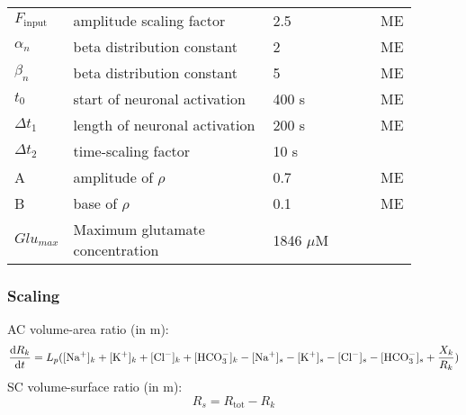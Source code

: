 \begin{table}[h!]
\centering
\begin{tabular}{ p{0.09\linewidth}  >{\footnotesize} p{0.5\linewidth}  >{\footnotesize} p{0.27\linewidth} >{\footnotesize} p{0.03\linewidth} }
\hline
$F_{\text{input}}$ 		& amplitude scaling factor 		& 2.5 		& ME \\ %
$\alpha_n$ 				& beta distribution constant	& 2 		& ME  \\ %
$\beta_n$ 				& beta distribution constant	& 5 		& ME  \\ %
$t_{0}$ 				& start of neuronal activation	& 400 s 	& ME  \\
$\Delta t_1$ 			& length of neuronal activation & 200 s 	& ME  \\
$\Delta t_2$ 			& time-scaling factor			& 10 s		& \citep{Ostby2009}   \\
A						& amplitude of $\rho$ 			& 0.7		& ME \\
B						& base of $\rho$				& 0.1 		& ME \\
$Glu_{max}$				& Maximum glutamate concentration & 1846 $\mu$M & \citep{Santucci2008} \\
\hline
\end{tabular}
\end{table}


\subsubsection*{Scaling}
\gls{AC} volume-area ratio (in m):
\begin{equation} \label{eq:R_k}
	\begin{aligned}
	\dfrac{\mathrm{d}R_k}{\mathrm{d}t}= L_p([\text{Na$^+$}]_k + [\text{K$^+$}]_k + [\text{Cl$^-$}]_k + [\text{HCO$_3^-$}]_k - [\text{Na$^+$}]_s - [\text{K$^+$}]_s - [\text{Cl$^-$}]_s - [\text{HCO$_3^-$}]_s + \frac{X_k}{R_k})
	\end{aligned}
\end{equation}
%
\gls{SC} volume-surface ratio  (in m):
\begin{equation} \label{eq:R_tot}
R_s = R_{\text{tot}} - R_k  
\end{equation}


